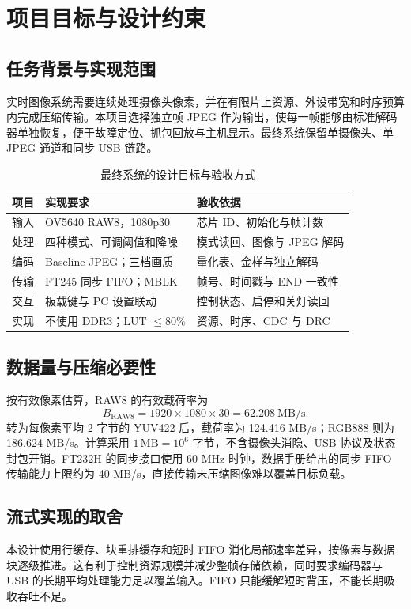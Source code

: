 \section{项目目标与设计约束}
\subsection{任务背景与实现范围}
实时图像系统需要连续处理摄像头像素，并在有限片上资源、外设带宽和时序预算内完成压缩传输。本项目选择独立帧 JPEG 作为输出，使每一帧能够由标准解码器单独恢复，便于故障定位、抓包回放与主机显示。最终系统保留单摄像头、单 JPEG 通道和同步 USB 链路。

\begin{table}[H]\centering\caption{最终系统的设计目标与验收方式}
\begin{tabularx}{\linewidth}{@{}lYY@{}}\toprule
项目 & 实现要求 & 验收依据\\\midrule
输入 & OV5640 RAW8，1080p30 & 芯片 ID、初始化与帧计数\\
处理 & 四种模式、可调阈值和降噪 & 模式读回、图像与 JPEG 解码\\
编码 & Baseline JPEG；三档画质 & 量化表、金样与独立解码\\
传输 & FT245 同步 FIFO；MBLK & 帧号、时间戳与 END 一致性\\
交互 & 板载键与 PC 设置联动 & 控制状态、启停和关灯读回\\
实现 & 不使用 DDR3；LUT $\leq80\%$ & 资源、时序、CDC 与 DRC\\\bottomrule
\end{tabularx}\end{table}

\subsection{数据量与压缩必要性}
按有效像素估算，RAW8 的有效载荷率为
\begin{equation}
B_{\mathrm{RAW8}}=1920\times1080\times30=62.208\ \mathrm{MB/s}.
\end{equation}
转为每像素平均 2 字节的 YUV422 后，载荷率为 124.416 MB/s；RGB888 则为 186.624 MB/s。计算采用 $1\,\mathrm{MB}=10^6$ 字节，不含摄像头消隐、USB 协议及状态封包开销。FT232H 的同步接口使用 60 MHz 时钟，数据手册给出的同步 FIFO 传输能力上限约为 40 MB/s，直接传输未压缩图像难以覆盖目标负载。

\subsection{流式实现的取舍}
本设计使用行缓存、块重排缓存和短时 FIFO 消化局部速率差异，按像素与数据块逐级推进。这有利于控制资源规模并减少整帧存储依赖，同时要求编码器与 USB 的长期平均处理能力足以覆盖输入。FIFO 只能缓解短时背压，不能长期吸收吞吐不足。

